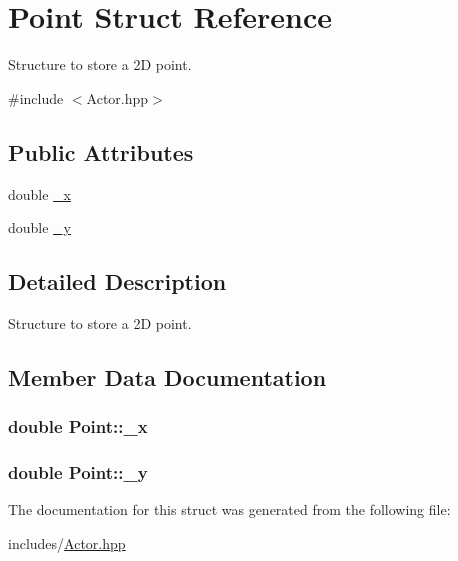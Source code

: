 \hypertarget{structPoint}{\section{Point Struct Reference}
\label{structPoint}
}


Structure to store a 2\-D point.  




{\ttfamily \#include $<$Actor.\-hpp$>$}

\subsection*{Public Attributes}
\begin{DoxyCompactItemize}
\item 
double \hyperlink{structPoint_a77b9bd094b57efb7c185fdb3fb781900}{\-\_\-x}
\item 
double \hyperlink{structPoint_aa8be383c30dee092979999b523373658}{\-\_\-y}
\end{DoxyCompactItemize}


\subsection{Detailed Description}
Structure to store a 2\-D point. 

\subsection{Member Data Documentation}
\hypertarget{structPoint_a77b9bd094b57efb7c185fdb3fb781900}{
\subsubsection[{\-\_\-x}]{\setlength{\rightskip}{0pt plus 5cm}double Point\-::\-\_\-x}}\label{structPoint_a77b9bd094b57efb7c185fdb3fb781900}
\hypertarget{structPoint_aa8be383c30dee092979999b523373658}{
\subsubsection[{\-\_\-y}]{\setlength{\rightskip}{0pt plus 5cm}double Point\-::\-\_\-y}}\label{structPoint_aa8be383c30dee092979999b523373658}


The documentation for this struct was generated from the following file\-:\begin{DoxyCompactItemize}
\item 
includes/\hyperlink{Actor_8hpp}{Actor.\-hpp}\end{DoxyCompactItemize}
